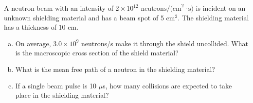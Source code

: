 \documentclass{report}
\begin{document}
A neutron beam with an intensity of $2 \times 10^{12}\text{ neutrons/(cm}^2{\cdot}\text{s)}$ is incident on an unknown shielding material and has a beam spot of 5 cm$^2$. The shielding material has a thickness of 10 cm.
\begin{enumerate}[a)]
\item On average, $3.0\times10^9$ neutrons/s make it through the shield uncollided. What is the macroscopic cross section of the shield material?
\item What is the mean free path of a neutron in the shielding material?
\item If a single beam pulse is 10 $\mu$s, how many collisions are expected to take place in the shielding material?
\end{enumerate}
\end{document}
